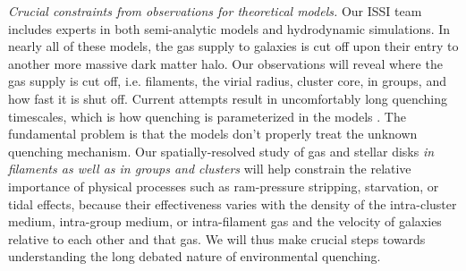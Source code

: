 \documentclass[11pt]{article}
\begin{document}

\textit{Crucial constraints from observations for theoretical models.} Our
ISSI team includes experts in both semi-analytic models and hydrodynamic simulations.  In nearly all of these
models, the gas supply to galaxies is cut off upon their entry to
another more massive dark matter halo.
Our observations will reveal where the gas supply is cut off, i.e. filaments, the virial radius, cluster core, in groups, and how fast it is shut off.  Current
attempts result in uncomfortably
long quenching timescales, which is how quenching is parameterized in the models \citep{McGee11,DeLucia12a}. The fundamental
problem is that the models don't properly treat the unknown quenching mechanism.
Our spatially-resolved study of gas and stellar disks {\em in filaments as well as in groups and clusters} will help constrain the relative importance of physical processes such as ram-pressure stripping, starvation, or tidal effects, because their effectiveness varies with
the density of the intra-cluster medium, intra-group medium, or intra-filament gas and the velocity of galaxies relative to each other and that gas. 
We will thus make crucial steps towards understanding the long debated nature of environmental quenching.
\end{document}
